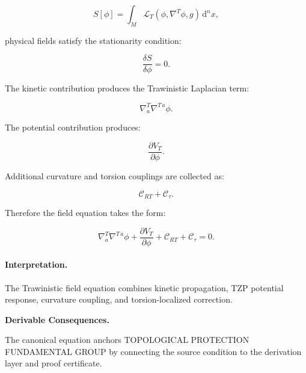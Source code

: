 \begin{equation}
S[\phi]
=
\int_M
\mathcal{L}_T
\left(
\phi,\nabla^T\phi,g
\right)
\,\mathrm{d}^n x ,
\end{equation}

physical fields satisfy the stationarity condition:

\begin{equation}
\frac{\delta S}{\delta\phi}=0 .
\end{equation}

The kinetic contribution produces the Trawinistic Laplacian term:

\begin{equation}
\nabla^T_a\nabla^{T\,a}\phi .
\end{equation}

The potential contribution produces:

\begin{equation}
\frac{\partial V_T}{\partial \phi}.
\end{equation}

Additional curvature and torsion couplings are collected as:

\begin{equation}
\mathcal{C}_{RT}
+
\mathcal{C}_{\tau}.
\end{equation}

Therefore the field equation takes the form:

\begin{equation}
\boxed{
\nabla^T_a\nabla^{T\,a}\phi
+
\frac{\partial V_T}{\partial \phi}
+
\mathcal{C}_{RT}
+
\mathcal{C}_{\tau}
=
0 .
}
\end{equation}

\paragraph{Interpretation.}
The Trawinistic field equation combines kinetic propagation, TZP potential response, curvature coupling, and torsion-localized correction.

\par\vspace{0.35em}
\noindent\textbf{Derivable Consequences.}\quad
\begingroup
\footnotesize
\raggedright
The canonical equation anchors TOPOLOGICAL PROTECTION FUNDAMENTAL GROUP by connecting the source condition to the derivation layer and proof certificate.
\par\endgroup

